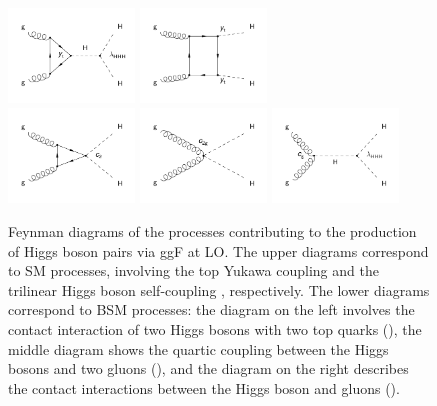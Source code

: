 \documentclass[11pt,twoside,a4paper,cmspaper,final,collab]{cms-tdr}
\begin{document}
\begin{figure}[hbt]
\centering
\includegraphics[width=0.3\textwidth]{Figure_001-a.pdf}
\includegraphics[width=0.3\textwidth]{Figure_001-b.pdf}\\
\includegraphics[width=0.3\textwidth]{Figure_001-c.pdf}
\includegraphics[width=0.3\textwidth]{Figure_001-d.pdf}
\includegraphics[width=0.3\textwidth]{Figure_001-e.pdf}\\
\caption{Feynman diagrams of the processes contributing to the production of Higgs boson pairs via ggF at LO. The upper diagrams correspond to SM processes, involving the top Yukawa coupling \yt and the trilinear Higgs boson self-coupling \lbdHHH, respectively. The lower diagrams correspond to BSM processes: the diagram on the left involves the contact interaction of two Higgs bosons with two top quarks (\ctwo), the middle diagram shows the quartic coupling between the Higgs bosons and two gluons (\cgg), and the diagram on the right describes the contact interactions between the Higgs boson and gluons (\cg).\label{fig:dia}}
\end{figure}
\end{document}

